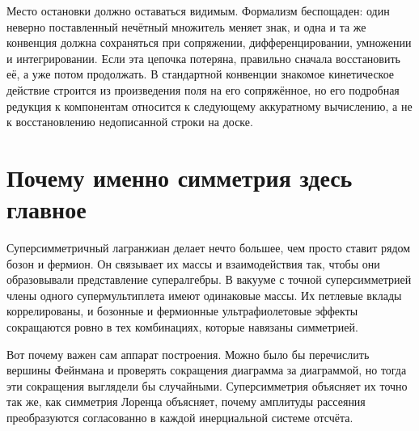 Место остановки должно оставаться видимым. Формализм беспощаден: один неверно поставленный нечётный множитель меняет знак, и одна и та же конвенция должна сохраняться при сопряжении, дифференцировании, умножении и интегрировании. Если эта цепочка потеряна, правильно сначала восстановить её, а уже потом продолжать. В стандартной конвенции знакомое кинетическое действие строится из произведения поля на его сопряжённое, но его подробная редукция к компонентам относится к следующему аккуратному вычислению, а не к восстановлению недописанной строки на доске.

\section{Почему именно симметрия здесь главное}

Суперсимметричный лагранжиан делает нечто большее, чем просто ставит рядом бозон и фермион. Он связывает их массы и взаимодействия так, чтобы они образовывали представление супералгебры. В вакууме с точной суперсимметрией члены одного супермультиплета имеют одинаковые массы. Их петлевые вклады коррелированы, и бозонные и фермионные ультрафиолетовые эффекты сокращаются ровно в тех комбинациях, которые навязаны симметрией.

Вот почему важен сам аппарат построения. Можно было бы перечислить вершины Фейнмана и проверять сокращения диаграмма за диаграммой, но тогда эти сокращения выглядели бы случайными. Суперсимметрия объясняет их точно так же, как симметрия Лоренца объясняет, почему амплитуды рассеяния преобразуются согласованно в каждой инерциальной системе отсчёта.


\begin{classroomqa}
\end{classroomqa}


